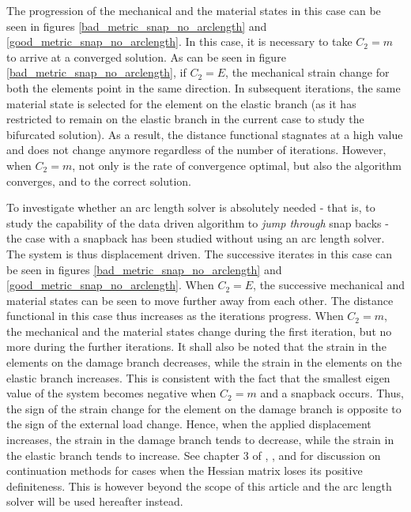 \documentclass[11pt]{elsarticle}
\begin{document}
The progression of the mechanical and the material states in this case can be seen in figures \ref{bad_metric_snap_no_arclength} and \ref{good_metric_snap_no_arclength}. In this case, it is necessary to take $C_2=m$ to arrive at a converged solution. As can be seen in figure \ref{bad_metric_snap_no_arclength}, if $C_2=E$, the mechanical strain change for both the elements point in the same direction. In subsequent iterations, the same material state is selected for the element on the elastic branch (as it has restricted to remain on the elastic branch in the current case to study the bifurcated solution). As a result, the distance functional stagnates at a high value and does not change anymore regardless of the number of iterations. However, when $C_2=m$, not only is the rate of convergence optimal, but also the algorithm converges, and to the correct solution.

To investigate whether an arc length solver is absolutely needed - that is, to study the capability of the data driven algorithm to \textit{jump through} snap backs - the case with a snapback has been studied without using an arc length solver. The system is thus displacement driven. The successive iterates in this case can be seen in figures \ref{bad_metric_snap_no_arclength} and \ref{good_metric_snap_no_arclength}. When $C_2=E$, the successive mechanical and material states can be seen to move further away from each other. The distance functional in this case thus increases as the iterations progress. When $C_2=m$, the mechanical and the material states change during the first iteration, but no more during the further iterations. It shall also be noted that the strain in the elements on the damage branch decreases, while the strain in the elements on the elastic branch increases. This is consistent with the fact that the smallest eigen value of the system becomes negative when $C_2=m$ and a snapback occurs. Thus, the sign of the strain change for the element on the damage branch is opposite to the sign of the external load change. Hence, when the applied displacement increases, the strain in the damage branch tends to decrease, while the strain in the elastic branch tends to increase. See chapter 3 of \cite{deBorst1986}, \cite{deBorst1987b}, and \cite{Baldelli2021} for discussion on continuation methods for cases when the Hessian matrix loses its positive definiteness. This is however beyond the scope of this article and the arc length solver will be used hereafter instead.
\end{document}
